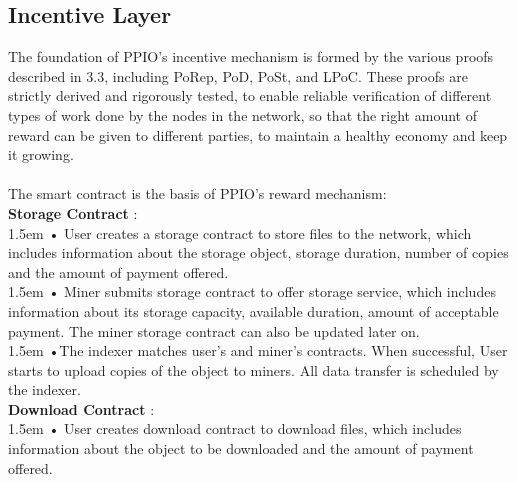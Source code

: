 \documentclass[10pt,a4paper]{article}
\begin{document}
        \subsection{Incentive Layer}  %
The foundation of PPIO’s incentive mechanism is formed by the various proofs described in 3.3, including PoRep, PoD, PoSt, and LPoC. These proofs are strictly derived and rigorously tested, to enable reliable verification of different types of work done by the nodes in the network, so that the right amount of reward can be given to different parties, to maintain a healthy economy and keep it growing.
\vspace{-0.5em}
\\ \\  The smart contract is the basis of PPIO’s reward mechanism:
\vspace{-0.5em}
\\

\noindent   
  {\bf Storage Contract }: 
  \vspace{-0.8em}
\\

\hangindent 1.5em
\noindent   
• User creates a storage contract to store files to the network, which includes information about the storage object, storage duration, number of copies and the amount of payment offered.
  \vspace{-0.8em}
\\

\hangindent 1.5em
\noindent   
• Miner submits storage contract to offer storage service, which includes information about its storage capacity, available duration, amount of acceptable payment. The miner storage contract can also be updated later on.
  \vspace{-0.8em}
\\

\hangindent 1.5em
\noindent   
•\quad The indexer matches user's and miner’s contracts. When successful, User starts to upload copies of the object to miners. All data transfer is scheduled by the indexer.
  \vspace{-0.5em}
\\

\noindent   
 {\bf Download Contract }: 
   \vspace{-0.8em}
\\

\hangindent 1.5em
\noindent   
• User creates download contract to download files, which includes information about the object to be downloaded and the amount of payment offered.
  \vspace{-0.8em}
\\
\end{document}
